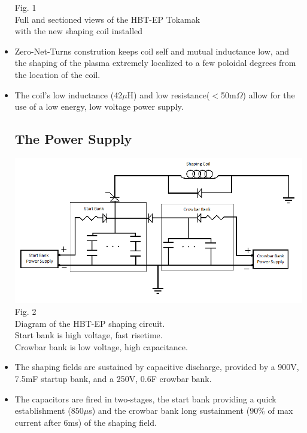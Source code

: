 \documentclass{article}
\begin{document}
\begin{multicols}{5}
\begin{itemize}
\begin{center}
\newline
Fig. 1\\
Full and sectioned views of the HBT-EP Tokamak\\
with the new shaping coil installed\\
\vspace{.25in}
\end{center}
\item Zero-Net-Turns constrution keeps coil self and mutual inductance low, and the shaping of the plasma extremely localized to a few poloidal degrees from the location of the coil.
\item The coil's low inductance (42$\mu$H) and low resistance($<$50m$\Omega$) allow for the use of a low energy, low voltage power supply.
\subsection{The Power Supply}
\begin{center}
\vspace{.25in}
\includegraphics[width=0.9\columnwidth]{Simplified_bank_diagram.png}
\newline
Fig. 2\\
Diagram of the HBT-EP shaping circuit.\\
Start bank is high voltage, fast risetime.\\
Crowbar bank is low voltage, high capacitance.\\
\vspace{.25in}
\end{center}
\item The shaping fields are sustained by capacitive discharge, provided by a 900V, 7.5mF startup bank, and a 250V, 0.6F crowbar bank.  
\item The capacitors are fired in two-stages, the start bank providing a quick establishment (850$\mu$s) and the crowbar bank long sustainment (90$\%$ of max current after 6ms) of the shaping field.

\end{itemize}
\end{multicols}
\end{document}

